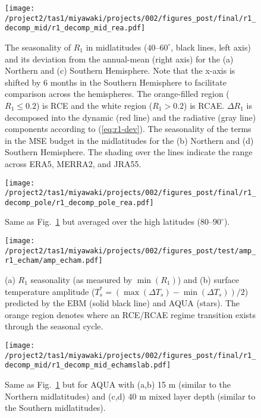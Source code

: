 \documentclass{ametsocV5}
\begin{document}
\begin{figure}[t]
  \noindent\texttt{[image: /project2/tas1/miyawaki/projects/002/figures\_post/final/r1\_decomp\_mid/r1\_decomp\_mid\_rea.pdf]}\\
  \caption{The seasonality of $R_{1}$ in midlatitudes ($40$--$60^{\circ}$, black lines, left axis) and its deviation from the annual-mean (right axis) for the (a) Northern and (c) Southern Hemisphere. Note that the x-axis is shifted by 6 months in the Southern Hemisphere to facilitate comparison across the hemispheres. The orange-filled region ($R_1 \le 0.2$) is RCE and the white region ($R_1>0.2$) is RCAE. $\Delta R_1$ is decomposed into the dynamic (red line) and the radiative (gray line) components according to (\ref{eq:r1-dev}). The seasonality of the terms in the MSE budget in the midlatitudes for the (b) Northern and (d) Southern Hemisphere. The shading over the lines indicate the range across ERA5, MERRA2, and JRA55.}
  \label{fig:rea-r1-decomp-mid}
\end{figure}

\begin{figure}[t]
  \noindent\texttt{[image: /project2/tas1/miyawaki/projects/002/figures\_post/final/r1\_decomp\_pole/r1\_decomp\_pole\_rea.pdf]}\\
  \caption{Same as Fig.~\ref{fig:rea-r1-decomp-mid} but averaged over the high latitudes ($80$--$90^{\circ}$).}
  \label{fig:rea-r1-decomp-pole}
\end{figure}

\begin{figure}
  \noindent\texttt{[image: /project2/tas1/miyawaki/projects/002/figures\_post/test/amp\_r1\_echam/amp\_echam.pdf]}\\
  \caption{(a) $R_1$ seasonality (as measured by $\min(R_1)$) and (b) surface temperature amplitude ($T_s^*=(\max(\Delta T_s)- \min(\Delta T_s))/2$) predicted by the EBM (solid black line) and AQUA (stars). The orange region denotes where an RCE/RCAE regime transition exists through the seasonal cycle.}
  \label{fig:amp-r1-echam}
\end{figure}

\begin{figure}[t]
    \noindent\texttt{[image: /project2/tas1/miyawaki/projects/002/figures\_post/final/r1\_decomp\_mid/r1\_decomp\_mid\_echamslab.pdf]}\\
    \caption{Same as Fig.~\ref{fig:rea-r1-decomp-mid} but for AQUA with (a,b) 15 m (similar to the Northern midlatitudes) and (c,d) 40 m mixed layer depth (similar to the Southern midlatitudes).}
\label{fig:echam-rce}
\end{figure}
\end{document}
